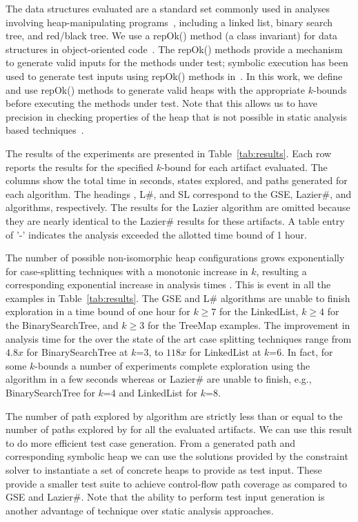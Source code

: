 The data structures evaluated are a standard set commonly used in
analyses involving heap-manipulating
programs~\cite{Deng:2006,Deng:2007,boyapati2002korat,Ferrara:2014,Rosner:2015},
including a linked list, binary search tree, and red/black tree. We
use a repOk() method (a class invariant) for data structures in
object-oriented code~\cite{boyapati2002korat}. The repOk() methods
provide a mechanism to generate valid inputs for the methods under
test; symbolic execution has been used to generate test inputs using
repOk() methods in~\cite{visser2004test}. In this work, we define and
use repOk() methods to generate valid heaps with the appropriate
$k$-bounds before executing the methods under test. Note that this
allows us to have precision in checking properties of the heap that is
not possible in static analysis based techniques~\cite{Dillig:2011}.

The results of the experiments are presented in
Table~\ref{tab:results}.  Each row reports the results for the
specified $k$-bound for each artifact evaluated. The columns show the
total time in seconds, states explored, and paths generated for each
algorithm. The headings \gsetxt{}, L\#, and SL correspond to the GSE,
Lazier\#, and \symtxt{} algorithms, respectively. The results for the
Lazier algorithm are omitted because they are nearly identical to the
Lazier\# results for these artifacts. A table entry of '-' indicates
the analysis exceeded the allotted time bound of 1 hour.

The number of possible non-isomorphic heap configurations grows
exponentially for case-splitting techniques with a monotonic increase
in $k$, resulting a corresponding exponential increase in analysis
times . This is event in all the examples in
Table~\ref{tab:results}. The GSE and L\# algorithms are unable to
finish exploration in a time bound of one hour for $k\geq 7$ for the
LinkedList, $k\geq 4$ for the BinarySearchTree, and $k\geq 3$ for the
TreeMap examples. The improvement in analysis time for the \symtxt{}
over the state of the art case splitting techniques range from $4.8x$
for BinarySearchTree at $k$=3, to $118x$ for LinkedList at $k$=6. In
fact, for some $k$-bounds a number of experiments complete exploration
using the \symtxt{} algorithm in a few seconds whereas \gsetxt{} or
Lazier\# are unable to finish, e.g., BinarySearchTree for $k$=4 and
LinkedList for $k$=8. 

The number of path explored by \symtxt{} algorithm are strictly less
than or equal to the number of paths explored by \gsetxt{} for all the
evaluated artifacts. We can use this result to do more efficient test
case generation. From a generated path and corresponding symbolic heap
we can use the solutions provided by the constraint solver to
instantiate a set of concrete heaps to provide as test input. These
provide a smaller test suite to achieve control-flow path coverage as
compared to GSE and Lazier\#. Note that the ability to perform test
input generation is another advantage of \symtxt{} technique over
static analysis approaches.

